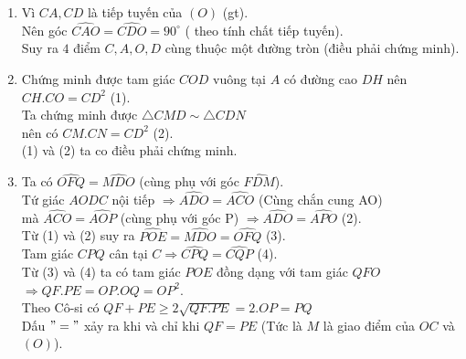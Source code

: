 \begin{ex}
{\begin{center}
		\end{center}
		\begin{enumerate}
			\item 	Vì $CA, CD$ là tiếp tuyến của $(O)$ (gt).\\
			Nên góc $\widehat{CAO} = \widehat{CDO} = 90^\circ$ ( theo tính chất tiếp tuyến).\\
			Suy ra $4$ điểm $C, A, O, D$ cùng thuộc một đường tròn (điều phải chứng minh).
			\item 	Chứng minh được tam giác $COD$ vuông tại $A$ có đường cao $DH$ nên\\
			$CH.CO = CD^2$ (1).\\
			Ta chứng minh được $\triangle CMD\sim \triangle CDN$\\
			nên có $CM.CN = CD^2$ (2).\\
			(1)	và (2) ta co điều phải chứng minh.
			\item Ta có $\widehat{OFQ}= \widehat{MDO}$ (cùng phụ với góc $\widehat{FDM}$).\\	
			Tứ giác $AODC$ nội tiếp $\Rightarrow \widehat{ADO}=\widehat{ACO}$ (Cùng chắn cung AO)\\
			mà $\widehat{ACO} =\widehat{AOP}$ (cùng phụ với góc P) $\Rightarrow \widehat{ADO}=\widehat{APO}$ (2).\\
			Từ (1) và (2) suy ra $\widehat{POE}=\widehat{MDO}=\widehat{OFQ}$  (3).\\
			Tam giác $CPQ$ cân tại $C \Rightarrow \widehat{CPQ}=\widehat{CQP}$ (4).\\
			Từ (3) và (4) ta có tam giác $POE$ đồng dạng với tam giác $QFO$\\$\Rightarrow QF.PE=OP.OQ=OP^2$.\\
			Theo Cô-si có  $QF+PE\geq 2\sqrt{QF.PE}=2.OP=PQ$\\
			Dấu $"="$ xảy ra khi và chỉ khi $QF = PE$  (Tức là $M$ là giao điểm của $OC$ và $(O)$).			
		\end{enumerate}
		
	} 
\end{ex}
